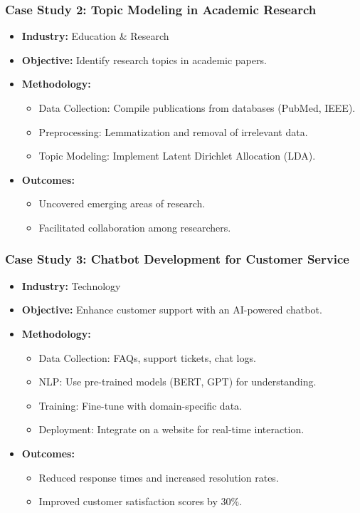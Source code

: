 \documentclass[aspectratio=169]{beamer}
\begin{document}
\begin{frame}[fragile]
  \frametitle{Case Study 2: Topic Modeling in Academic Research}
  \begin{itemize}
    \item \textbf{Industry:} Education \& Research
    \item \textbf{Objective:} Identify research topics in academic papers.
    \item \textbf{Methodology:}
      \begin{itemize}
        \item Data Collection: Compile publications from databases (PubMed, IEEE).
        \item Preprocessing: Lemmatization and removal of irrelevant data.
        \item Topic Modeling: Implement Latent Dirichlet Allocation (LDA).
      \end{itemize}
    \item \textbf{Outcomes:}
      \begin{itemize}
        \item Uncovered emerging areas of research.
        \item Facilitated collaboration among researchers.
      \end{itemize}
  \end{itemize}
\end{frame}

\begin{frame}[fragile]
  \frametitle{Case Study 3: Chatbot Development for Customer Service}
  \begin{itemize}
    \item \textbf{Industry:} Technology
    \item \textbf{Objective:} Enhance customer support with an AI-powered chatbot.
    \item \textbf{Methodology:}
      \begin{itemize}
        \item Data Collection: FAQs, support tickets, chat logs.
        \item NLP: Use pre-trained models (BERT, GPT) for understanding.
        \item Training: Fine-tune with domain-specific data.
        \item Deployment: Integrate on a website for real-time interaction.
      \end{itemize}
    \item \textbf{Outcomes:}
      \begin{itemize}
        \item Reduced response times and increased resolution rates.
        \item Improved customer satisfaction scores by 30\%.
      \end{itemize}
  \end{itemize}
\end{frame}
\end{document}
